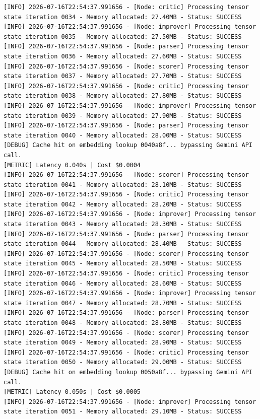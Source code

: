 \documentclass[10pt,journal,compsoc]{IEEEtran}
\begin{document}
\begin{verbatim}
[INFO] 2026-07-16T22:54:37.991656 - [Node: critic] Processing tensor state iteration 0034 - Memory allocated: 27.40MB - Status: SUCCESS
[INFO] 2026-07-16T22:54:37.991656 - [Node: improver] Processing tensor state iteration 0035 - Memory allocated: 27.50MB - Status: SUCCESS
[INFO] 2026-07-16T22:54:37.991656 - [Node: parser] Processing tensor state iteration 0036 - Memory allocated: 27.60MB - Status: SUCCESS
[INFO] 2026-07-16T22:54:37.991656 - [Node: scorer] Processing tensor state iteration 0037 - Memory allocated: 27.70MB - Status: SUCCESS
[INFO] 2026-07-16T22:54:37.991656 - [Node: critic] Processing tensor state iteration 0038 - Memory allocated: 27.80MB - Status: SUCCESS
[INFO] 2026-07-16T22:54:37.991656 - [Node: improver] Processing tensor state iteration 0039 - Memory allocated: 27.90MB - Status: SUCCESS
[INFO] 2026-07-16T22:54:37.991656 - [Node: parser] Processing tensor state iteration 0040 - Memory allocated: 28.00MB - Status: SUCCESS
[DEBUG] Cache hit on embedding lookup 0040a8f... bypassing Gemini API call.
[METRIC] Latency 0.040s | Cost $0.0004
[INFO] 2026-07-16T22:54:37.991656 - [Node: scorer] Processing tensor state iteration 0041 - Memory allocated: 28.10MB - Status: SUCCESS
[INFO] 2026-07-16T22:54:37.991656 - [Node: critic] Processing tensor state iteration 0042 - Memory allocated: 28.20MB - Status: SUCCESS
[INFO] 2026-07-16T22:54:37.991656 - [Node: improver] Processing tensor state iteration 0043 - Memory allocated: 28.30MB - Status: SUCCESS
[INFO] 2026-07-16T22:54:37.991656 - [Node: parser] Processing tensor state iteration 0044 - Memory allocated: 28.40MB - Status: SUCCESS
[INFO] 2026-07-16T22:54:37.991656 - [Node: scorer] Processing tensor state iteration 0045 - Memory allocated: 28.50MB - Status: SUCCESS
[INFO] 2026-07-16T22:54:37.991656 - [Node: critic] Processing tensor state iteration 0046 - Memory allocated: 28.60MB - Status: SUCCESS
[INFO] 2026-07-16T22:54:37.991656 - [Node: improver] Processing tensor state iteration 0047 - Memory allocated: 28.70MB - Status: SUCCESS
[INFO] 2026-07-16T22:54:37.991656 - [Node: parser] Processing tensor state iteration 0048 - Memory allocated: 28.80MB - Status: SUCCESS
[INFO] 2026-07-16T22:54:37.991656 - [Node: scorer] Processing tensor state iteration 0049 - Memory allocated: 28.90MB - Status: SUCCESS
[INFO] 2026-07-16T22:54:37.991656 - [Node: critic] Processing tensor state iteration 0050 - Memory allocated: 29.00MB - Status: SUCCESS
[DEBUG] Cache hit on embedding lookup 0050a8f... bypassing Gemini API call.
[METRIC] Latency 0.050s | Cost $0.0005
[INFO] 2026-07-16T22:54:37.991656 - [Node: improver] Processing tensor state iteration 0051 - Memory allocated: 29.10MB - Status: SUCCESS

\end{verbatim}
\end{document}
